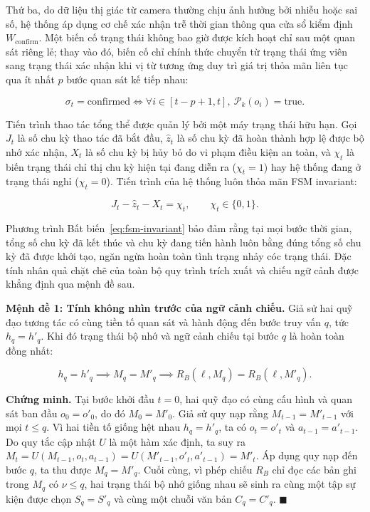 Thứ ba, do dữ liệu thị giác từ camera thường chịu ảnh hưởng bởi nhiễu hoặc sai số, hệ thống áp dụng cơ chế xác nhận trễ thời gian thông qua cửa sổ kiểm định $W_{\mathrm{confirm}}$. Một biến cố trạng thái không bao giờ được kích hoạt chỉ sau một quan sát riêng lẻ; thay vào đó, biến cố chỉ chính thức chuyển từ trạng thái ứng viên sang trạng thái xác nhận khi vị từ tương ứng duy trì giá trị thỏa mãn liên tục qua ít nhất $p$ bước quan sát kế tiếp nhau:

\begin{equation}
\sigma_t = \text{confirmed} \iff \forall i \in [t - p + 1, t],\ \mathcal P_k(o_i) = \text{true}.
\label{eq:temporal-hysteresis}
\end{equation}

Tiến trình thao tác tổng thể được quản lý bởi một máy trạng thái hữu hạn. Gọi $J_t$ là số chu kỳ thao tác đã bắt đầu, $\hat z_t$ là số chu kỳ đã hoàn thành hợp lệ được bộ nhớ xác nhận, $X_t$ là số chu kỳ bị hủy bỏ do vi phạm điều kiện an toàn, và $\chi_t$ là biến trạng thái chỉ thị chu kỳ hiện tại đang diễn ra ($\chi_t = 1$) hay hệ thống đang ở trạng thái nghỉ ($\chi_t = 0$). Tiến trình của hệ thống luôn thỏa mãn FSM invariant:

\begin{equation}
J_t - \hat z_t - X_t = \chi_t,\qquad \chi_t \in \{0, 1\}.
\label{eq:fsm-invariant}
\end{equation}

Phương trình Bất biến~\eqref{eq:fsm-invariant} bảo đảm rằng tại mọi bước thời gian, tổng số chu kỳ đã kết thúc và chu kỳ đang tiến hành luôn bằng đúng tổng số chu kỳ đã được khởi tạo, ngăn ngừa hoàn toàn tình trạng nhảy cóc trạng thái. Đặc tính nhân quả chặt chẽ của toàn bộ quy trình trích xuất và chiếu ngữ cảnh được khẳng định qua mệnh đề sau.

\textbf{Mệnh đề 1: Tính không nhìn trước của ngữ cảnh chiếu.} Giả sử hai quỹ đạo tương tác có cùng tiền tố quan sát và hành động đến bước truy vấn $q$, tức $h_q = h'_q$. Khi đó trạng thái bộ nhớ và ngữ cảnh chiếu tại bước $q$ là hoàn toàn đồng nhất:

\begin{equation}
h_q = h'_q \implies M_q = M'_q \implies R_B(\ell, M_q) = R_B(\ell, M'_q).
\label{eq:non-anticipatory}
\end{equation}

\textbf{Chứng minh.} Tại bước khởi đầu $t=0$, hai quỹ đạo có cùng cấu hình và quan sát ban đầu $o_0 = o'_0$, do đó $M_0 = M'_0$. Giả sử quy nạp rằng $M_{t-1} = M'_{t-1}$ với mọi $t \le q$. Vì hai tiền tố giống hệt nhau $h_q = h'_q$, ta có $o_t = o'_t$ và $a_{t-1} = a'_{t-1}$. Do quy tắc cập nhật $U$ là một hàm xác định, ta suy ra $M_t = U(M_{t-1}, o_t, a_{t-1}) = U(M'_{t-1}, o'_t, a'_{t-1}) = M'_t$. Áp dụng quy nạp đến bước $q$, ta thu được $M_q = M'_q$. Cuối cùng, vì phép chiếu $R_B$ chỉ đọc các bản ghi trong $M_q$ có $\nu \le q$, hai trạng thái bộ nhớ giống nhau sẽ sinh ra cùng một tập sự kiện được chọn $S_q = S'_q$ và cùng một chuỗi văn bản $C_q = C'_q$. $\blacksquare$

